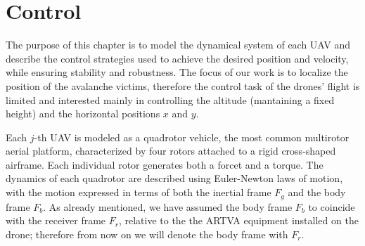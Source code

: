 \chapter{Control}
The purpose of this chapter is to model the dynamical system 
of each UAV and describe the control strategies used to achieve the 
desired position and velocity, while ensuring stability and robustness.
The focus of our work is to localize the position of the 
avalanche victims, therefore the control task of the drones' flight 
is limited and interested mainly in controlling the altitude 
(mantaining a fixed height) and the horizontal positions
$x$ and $y$.

Each $j$-th UAV is modeled as a quadrotor vehicle, the most common 
multirotor aerial platform, characterized by four rotors attached 
to a rigid cross-shaped airframe. Each individual rotor generates 
both a forcet and a torque. The dynamics of each quadrotor are 
described using Euler-Newton laws of motion, with the motion 
expressed in terms of both the inertial frame \( F_g \) and the 
body frame \( F_b \).
As already mentioned, we have assumed the body frame $F_b$
to coincide with the receiver frame $F_r$, relative to the
the ARTVA equipment installed on the drone; therefore 
from now on we will denote the body frame with $F_r$.



